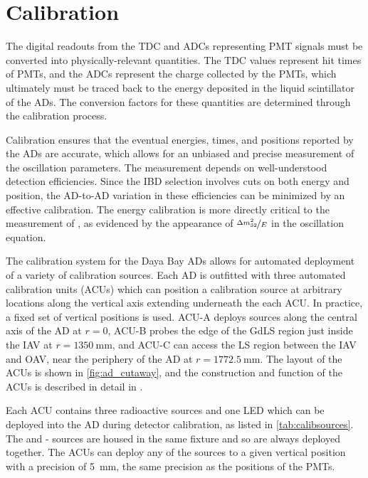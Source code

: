\chapter{Calibration}
\label{ch:calibration}


The digital readouts from the TDC and ADCs representing PMT signals
must be converted into physically-relevant quantities.
The TDC values represent hit times of PMTs,
and the ADCs represent the charge collected by the PMTs,
which ultimately must be traced back to the energy deposited
in the liquid scintillator of the ADs.
The conversion factors for these quantities are determined
through the calibration process.

Calibration ensures that the eventual energies, times, and positions
reported by the ADs are accurate,
which allows for an unbiased and precise measurement
of the oscillation parameters.
The \thetaot{} measurement depends on well-understood detection efficiencies.
Since the IBD selection involves cuts on both energy and position,
the AD-to-AD variation in these efficiencies can be minimized
by an effective calibration.
The energy calibration is more directly critical to the measurement
of \dmsquared{}, as evidenced by the appearance of $\nicefrac{\Delta m^2_{32}}{E}$
in the oscillation equation. 

The calibration system for the Daya Bay ADs
allows for automated deployment of a variety of calibration sources.
Each AD is outfitted with three automated calibration units (ACUs)
which can position a calibration source at arbitrary locations
along the vertical axis extending underneath the each ACU.
In practice, a fixed set of vertical positions is used.
ACU-A deploys sources along the central axis of the AD at $r=0$,
ACU-B probes the edge of the GdLS region just inside the IAV at $r=\SI{1350}{\mm}$,
and ACU-C can access the LS region between the IAV and OAV,
near the periphery of the AD at $r=\SI{1772.5}{\mm}$.
The layout of the ACUs is shown in \cref{fig:ad_cutaway},
and the construction and function of the ACUs
is described in detail in \cite{calib2014}.

Each ACU contains three radioactive sources and one LED
which can be deployed into the AD during detector calibration,
as listed in \cref{tab:calibsources}.
The  and - sources
are housed in the same fixture and so are always deployed together.
The ACUs can deploy any of the sources to a given vertical position
with a precision of \SI{5}{\mm},
the same precision as the positions of the PMTs.

